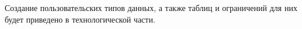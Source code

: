 \clearpage

Создание пользовательских типов данных, а также таблиц и ограничений для них будет приведено в технологической части. 



%
%
%
%
%

